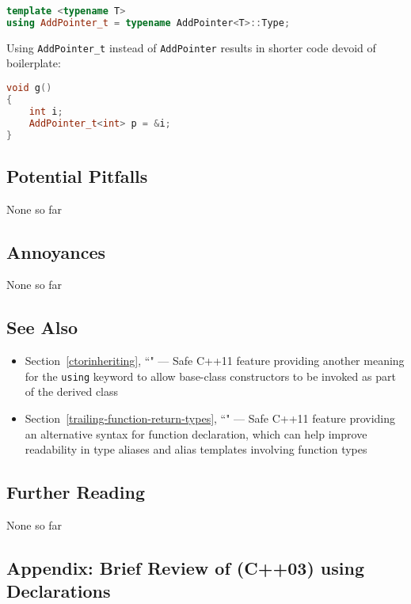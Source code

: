 \begin{lstlisting}[language=C++]
template <typename T>
using AddPointer_t = typename AddPointer<T>::Type;
\end{lstlisting}

\noindent Using \texttt{AddPointer\_t} instead of \texttt{AddPointer} results in
shorter code devoid of boilerplate:

\begin{lstlisting}[language=C++]
void g()
{
    int i;
    AddPointer_t<int> p = &i;
}
\end{lstlisting}


\subsection[Potential Pitfalls]{Potential Pitfalls}\label{potential-pitfalls}

None so far

\subsection[Annoyances]{Annoyances}\label{annoyances}

None so far

\subsection[See Also]{See Also}\label{see-also}

\begin{itemize}
\item{Section~\ref{ctorinheriting}, ``" — Safe C++11 feature providing another meaning for the \texttt{using} keyword to allow base-class constructors to be invoked as part of the derived class}
\item{Section~\ref{trailing-function-return-types}, ``" — Safe C++11 feature providing an alternative syntax for function declaration, which can help improve readability in type aliases and alias templates involving function types}
\end{itemize}

\subsection[Further Reading]{Further Reading}\label{further-reading}

None so far

\subsection[Appendix: Brief Review of (C++03) {\tt using} Declarations]{Appendix: Brief Review of (C++03) {\SubsecCode using} Declarations}\label{appendix:-brief-review-of-(c++03)-using-declarations}

